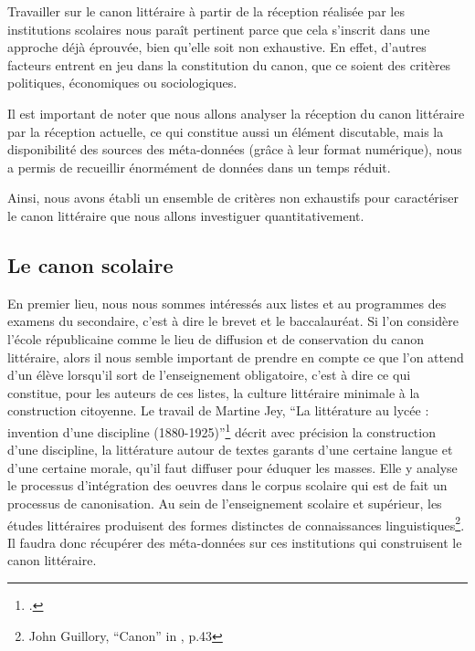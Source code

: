 Travailler sur le canon littéraire à partir de la réception réalisée par les institutions scolaires nous paraît pertinent parce que cela s'inscrit dans une approche déjà éprouvée, bien qu'elle soit non exhaustive. En effet, d'autres facteurs entrent en jeu dans la constitution du canon, que ce soient des critères politiques, économiques ou sociologiques.

Il est important de noter que nous allons analyser la réception du canon littéraire par la réception actuelle, ce qui constitue aussi un élément discutable, mais la disponibilité des sources des méta-données (grâce à leur format numérique), nous a permis de recueillir énormément de données dans un temps réduit. 

Ainsi, nous avons établi un ensemble de critères non exhaustifs pour caractériser le canon littéraire que nous allons investiguer quantitativement.

\subsection{Le canon scolaire}

En premier lieu, nous nous sommes intéressés aux listes et au programmes des examens du secondaire, c'est à dire le brevet et le baccalauréat. Si l'on considère l'école républicaine comme le lieu de diffusion et de conservation du canon littéraire, alors il nous semble important de prendre en compte ce que l'on attend d'un élève lorsqu'il sort de l'enseignement obligatoire, c'est à dire ce qui constitue, pour les auteurs de ces listes, la culture littéraire minimale à la construction citoyenne. Le travail de Martine Jey, \enquote{La littérature au lycée : invention d’une discipline (1880-1925)}\footcites{jey_litterature_1998} décrit avec précision la construction d'une discipline, la littérature autour de textes garants d'une certaine langue et d'une certaine morale, qu'il faut diffuser pour éduquer les masses. Elle y analyse le processus d'intégration des oeuvres dans le corpus scolaire qui est de fait un processus de canonisation. Au sein de l'enseignement scolaire et supérieur, les études littéraires produisent des formes distinctes de connaissances linguistiques\footnote{John Guillory, \enquote{Canon} in \cite{lentricchia_critical_2012},  p.43}. Il faudra donc récupérer des méta-données sur ces institutions qui construisent le canon littéraire.


